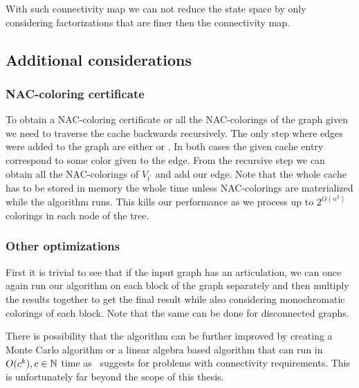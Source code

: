 With such connectivity map we can not reduce the state space by only considering
factorizations that are finer then the connectivity map.

\subsection{Additional considerations}

\subsubsection{NAC-coloring certificate}

To obtain a NAC-coloring certificate or all the NAC-colorings of the graph
given we need to traverse the cache backwards recursively.
The only step where edges were added to the graph are either \IntroduceEdgeNode{}
or \IntroduceVertexWithEdgesNode{}. In both cases the given cache entry correspond
to some color given to the edge. From the recursive step we can obtain
all the NAC-colorings of \( V_{t^\prime} \) and add our edge.
Note that the whole cache has to be stored in memory the whole time unless
NAC-colorings are materialized while the algorithm runs.
This kills our performance as we process up to \( 2^{O(n^2)} \) colorings
in each node of the tree.

\subsubsection{Other optimizations}

First it is trivial to see that if the input graph has an articulation,
we can once again run our algorithm on each block of the graph separately
and then multiply the results together to get the final result
while also considering monochromatic colorings of each block.
Note that the same can be done for disconnected graphs.

There is possibility that the algorithm can be further improved by creating
a Monte Carlo algorithm or a linear algebra based algorithm that can run
in \( O(c^k), c \in \mathbb{N} \) time as~\cite{book_parametrized_algorithms} suggests
for problems with connectivity requirements.
This is unfortunately far beyond the scope of this thesis.


